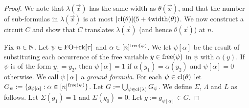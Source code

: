 \documentclass[../paper.tex]{subfiles}
\begin{document}
\begin{proof}
  We note that $\lambda(\vec{x})$ has the same width as $\theta(\vec{x})$, and
  that the number of sub-formulas in $\lambda(\vec{x})$ is at most $\vert
  \mathrm{cl}(\theta) \vert (5 + 4\mathrm{width}(\theta))$. We now construct a circuit $C$ and
  show that $C$ translates $\lambda(\vec{x})$ (and hence $\theta(\vec{x})$) at
  $n$.


  Fix $n \in \mathbb{N}$. Let $\psi \in \text{\upshape FO+rk}[\tau]$ and $\alpha \in [n]^{\mathrm{free}(\psi)}$. We let $\psi[\alpha]$ be the result of substituting each
  occurrence of the free variable $y \in \mathrm{free}(\psi)$ in $\psi$ with
  $\alpha(y)$. If $\psi$ is of the form $y_1 = y_2$, then $\psi [\alpha] = 1$ if
  $\alpha(y_1) = \alpha (y_2)$ and $\psi[\alpha] = 0$ otherwise. We call
  $\psi[\alpha]$ a \emph{ground formula}. For each $\psi \in \mathrm{cl}(\theta)$ let
  $G_\psi := \{g_{\phi[\alpha]} : \alpha \in [n]^{\mathrm{free}(\psi)} \}$. Let $G :=
  \bigcup_{\psi \in \mathrm{cl}(\lambda)} G_{\psi}$. We define $\Sigma$, $\Lambda$ and
  $L$ as follows. Let $\Sigma (g_1) = 1$ and $\Sigma (g_0) = 0$. Let $g :=
  g_{\psi[\alpha]} \in G$.
  

\end{proof}
\end{document}

